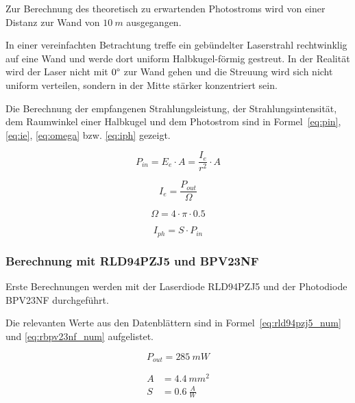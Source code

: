 Zur Berechnung des theoretisch zu erwartenden Photostroms wird von einer Distanz zur Wand von $10~m$ ausgegangen.

In einer vereinfachten Betrachtung treffe ein gebündelter Laserstrahl rechtwinklig auf eine Wand und werde dort uniform
Halbkugel-förmig gestreut. In der Realität wird der Laser nicht mit $0\degree$ zur Wand gehen und die Streuung wird sich
nicht uniform verteilen, sondern in der Mitte stärker konzentriert sein.

Die Berechnung der empfangenen Strahlungsleistung, der Strahlungsintensität, dem Raumwinkel einer Halbkugel und dem
Photostrom sind in Formel~\ref{eq:pin}, \ref{eq:ie}, \ref{eq:omega} bzw. \ref{eq:iph} gezeigt.

\begin{equation}\label{eq:pin}
    P_{in} = E_e \cdot A = \frac{I_e}{r^2} \cdot A
\end{equation}

\begin{equation}\label{eq:ie}
    I_e = \frac{P_{out}}{\Omega}
\end{equation}

\begin{equation}\label{eq:omega}
    \Omega = 4\cdot \pi \cdot 0.5
\end{equation}

\begin{equation}\label{eq:iph}
    I_{ph} = S \cdot P_{in}
\end{equation}

\subsubsection{Berechnung mit RLD94PZJ5 und BPV23NF}

Erste Berechnungen werden mit der Laserdiode RLD94PZJ5 \cite{rohm2020rld94pzj5_datasheet} und der Photodiode BPV23NF
\cite{vishay2024bpv23nf_datasheet} durchgeführt.

Die relevanten Werte aus den Datenblättern sind in Formel~\ref{eq:rld94pzj5_num} und \ref{eq:rbpv23nf_num} aufgelistet.

\begin{equation}\label{eq:rld94pzj5_num}
    P_{out} = 285~mW
\end{equation}

\begin{equation}\label{eq:rbpv23nf_num}
    \begin{split}
        A &= 4.4~mm^2\\
        S &= 0.6~\frac{A}{W}
    \end{split}
\end{equation}

